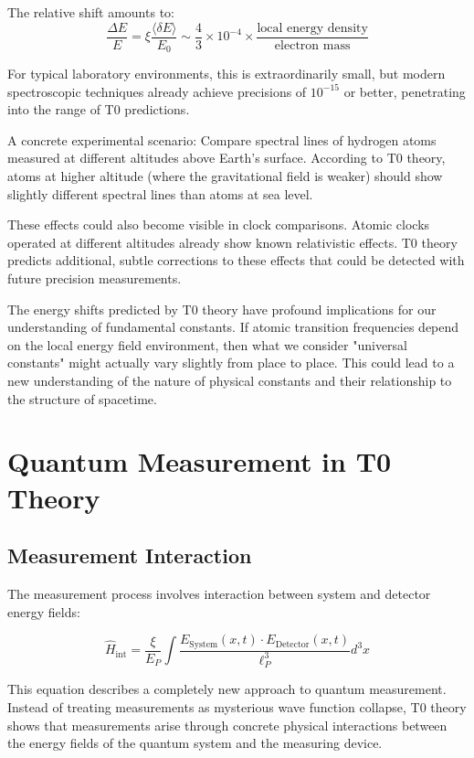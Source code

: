 \documentclass[12pt,a4paper]{article}
\newcommand{\deltaE}{\delta E}
\newcommand{\xipar}{\xi}
\newcommand{\EPlanck}{E_P}
\theoremstyle{definition}
\theoremstyle{remark}
\begin{document}
The relative shift amounts to:
$$\frac{\Delta E}{E} = \xipar \frac{\langle \deltaE \rangle}{E_0} \sim \frac{4}{3} \times 10^{-4} \times \frac{\text{local energy density}}{\text{electron mass}}$$

For typical laboratory environments, this is extraordinarily small, but modern spectroscopic techniques already achieve precisions of $10^{-15}$ or better, penetrating into the range of T0 predictions.

A concrete experimental scenario: Compare spectral lines of hydrogen atoms measured at different altitudes above Earth's surface. According to T0 theory, atoms at higher altitude (where the gravitational field is weaker) should show slightly different spectral lines than atoms at sea level.

These effects could also become visible in clock comparisons. Atomic clocks operated at different altitudes already show known relativistic effects. T0 theory predicts additional, subtle corrections to these effects that could be detected with future precision measurements.

The energy shifts predicted by T0 theory have profound implications for our understanding of fundamental constants. If atomic transition frequencies depend on the local energy field environment, then what we consider "universal constants" might actually vary slightly from place to place. This could lead to a new understanding of the nature of physical constants and their relationship to the structure of spacetime.

\section{Quantum Measurement in T0 Theory}

\subsection{Measurement Interaction}

The measurement process involves interaction between system and detector energy fields:

\begin{equation}
	\hat{H}_{\text{int}} = \frac{\xipar}{\EPlanck} \int \frac{E_{\text{System}}(x,t) \cdot E_{\text{Detector}}(x,t)}{\ell_P^3} d^3x
	\label{eq:measurement_interaction}
\end{equation}

This equation describes a completely new approach to quantum measurement. Instead of treating measurements as mysterious wave function collapse, T0 theory shows that measurements arise through concrete physical interactions between the energy fields of the quantum system and the measuring device.
\end{document}
